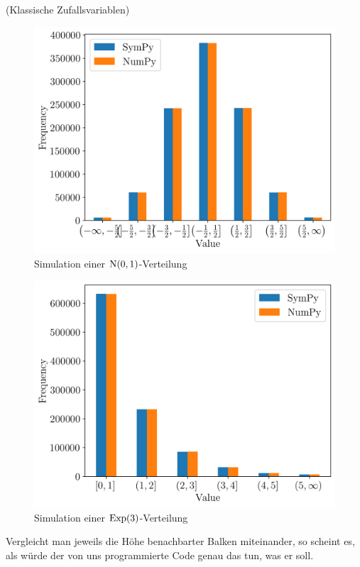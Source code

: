 \begin{Beispiel}{(Klassische Zufallsvariablen)}
\begin{minipage}{0.5\linewidth}
\begin{figure}[H]
\begin{center}
\includegraphics[width=\linewidth]{./Section/Simulation/Sim Normal.png}
\caption{Simulation einer $\operatorname{N}(0, 1)$-Verteilung}
\end{center}
\end{figure}
\end{minipage}
\begin{minipage}{0.5\linewidth}
\begin{figure}[H]
\begin{center}
\includegraphics[width=\linewidth]{./Section/Simulation/Sim Exp.png}
\caption{Simulation einer $\operatorname{Exp}(3)$-Verteilung}
\end{center}
\end{figure}
\end{minipage}

Vergleicht man jeweils die Höhe benachbarter Balken miteinander, so scheint es, als würde der von uns programmierte Code genau das tun, was er soll.
\end{Beispiel}

